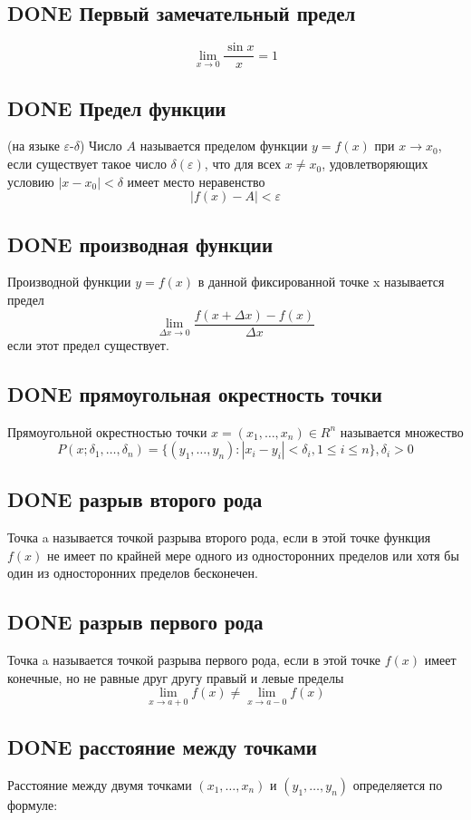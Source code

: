\documentclass[11pt]{article}
\begin{document}
\subsection{{\bfseries\sffamily DONE} Первый замечательный предел}
\label{sec:orgba89230}
$$\lim\limits_{x\to 0}\frac{\sin x}{x}=1$$
\subsection{{\bfseries\sffamily DONE} Предел функции}
\label{sec:org95f4891}
(на языке \(\varepsilon\)-\(\delta\)) Число \(A\) называется пределом функции \(y=f(x)\) при \(x\to x_0\), если существует такое число \(\delta(\varepsilon)\), что для всех \(x\ne x_0\), удовлетворяющих условию \(|x−x_0|<\delta\) имеет место неравенство
$$|f(x)−A|<\varepsilon$$
\subsection{{\bfseries\sffamily DONE} производная функции}
\label{sec:org1eedea3}
Производной функции \(y=f(x)\) в данной фиксированной точке x называется предел
$$\lim\limits_{\Delta x→0}\frac{f(x+\Delta x)−f(x)}{\Delta x}$$
если этот предел существует.
\subsection{{\bfseries\sffamily DONE} прямоугольная окрестность точки}
\label{sec:org5c0788e}
Прямоугольной окрестностью точки \(x=(x_1,…,x_n)\in R^n\) называется множество 
$$P(x;δ_1,…,δ_n)=\{(y_1,…,y_n):|x_i−y_i|<δ_i ,1\leq i\leq n\}, δ_i>0$$
\subsection{{\bfseries\sffamily DONE} разрыв второго рода}
\label{sec:org2fc87f1}
Точка a называется точкой разрыва второго рода, если в этой точке функция \(f(x)\) не имеет по крайней мере одного из односторонних пределов или хотя бы один из односторонних пределов бесконечен.
\subsection{{\bfseries\sffamily DONE} разрыв первого рода}
\label{sec:orgf005486}
Точка a называется точкой разрыва первого рода, если в этой точке \(f(x)\) имеет конечные, но не равные друг другу правый и левые пределы
$$\lim\limits_{x\to a+0}f(x)\ne\lim\limits_{x\to a−0}f(x)$$
\subsection{{\bfseries\sffamily DONE} расстояние между точками}
\label{sec:org071a968}
Расстояние между двумя точками \((x_1,…,x_n)\) и \((y_1,…,y_n)\) определяется по формуле:
\end{document}
